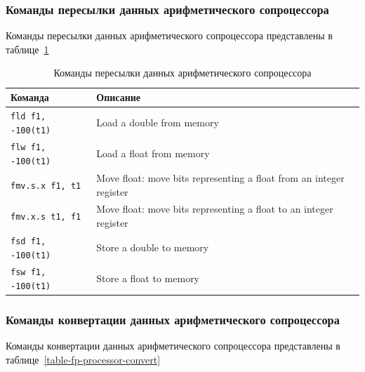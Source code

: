 \subsubsection{Команды пересылки данных арифметического сопроцессора}
Команды пересылки данных арифметического сопроцессора представлены в таблице~\ref{table-fp-processor-move}

\begin{table}[h]
    \caption{Команды пересылки данных арифметического сопроцессора}
    \centering
    \begin{tabularx}{\textwidth}{|l|X|}
        \hline
        \textbf{Команда} & \textbf{Описание} \\
        \hline \verb|fld f1, -100(t1)| & Load a double from memory \\
        \hline \verb|flw f1, -100(t1)| & Load a float from memory \\
        \hline \verb|fmv.s.x f1, t1| & Move float: move bits representing a float from an integer register \\
        \hline \verb|fmv.x.s t1, f1| & Move float: move bits representing a float to an integer register \\
        \hline \verb|fsd f1, -100(t1)| & Store a double to memory \\
        \hline \verb|fsw f1, -100(t1)| & Store a float to memory \\
        \hline
    \end{tabularx}
    \label{table-fp-processor-move}
\end{table}

\subsubsection{Команды конвертации данных арифметического сопроцессора}
Команды конвертации данных арифметического сопроцессора представлены в таблице~\ref{table-fp-processor-convert}

